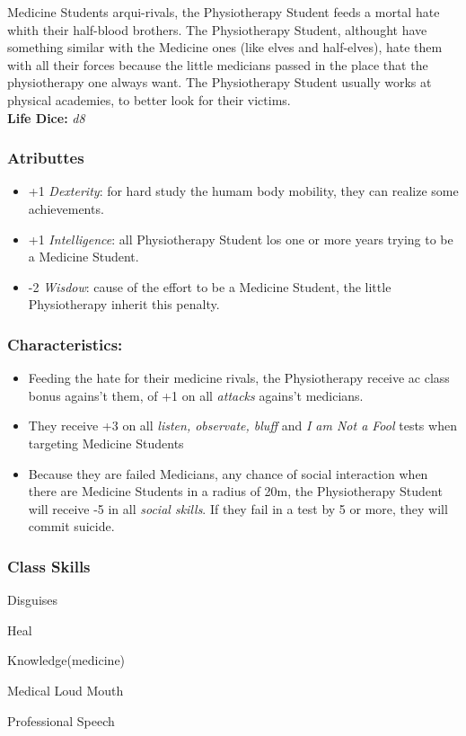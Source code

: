 \documentclass[ letterpaper,12pt]{article}
\begin{document}
Medicine Students arqui-rivals, the Physiotherapy Student feeds a mortal hate whith their half-blood brothers. The Physiotherapy Student, althought have something similar with the Medicine ones (like elves and half-elves), hate them with all their forces because the little medicians passed in the place that the physiotherapy one always want. The Physiotherapy Student usually works at physical academies, to better look for their victims.\\

{\bf Life Dice:} {\it d8}

\subsubsection{Atributtes}
\begin{itemize}
\item{+1 {\it Dexterity}: for hard study the humam body mobility, they can realize some achievements.}
\item{+1 {\it Intelligence}: all Physiotherapy Student los one or more years trying to be a Medicine Student.}
\item{-2 {\it Wisdow}: cause of the effort to be a Medicine Student, the little Physiotherapy inherit this penalty.}
\end{itemize}

\subsubsection{Characteristics:}
\begin{itemize}
\item{Feeding the hate for their medicine rivals, the Physiotherapy receive  ac class bonus agains't them, of +1 on all {\it attacks} agains't medicians.}
\item{They receive +3 on all {\it listen, observate, bluff} and {\it I am Not a Fool} tests when targeting Medicine Students}
\item{Because they are failed Medicians, any chance of social interaction when there are Medicine Students in a radius of 20m, the Physiotherapy Student will receive -5 in all {\it social skills}. If they fail in a test by 5 or more, they will commit suicide.}
\end{itemize}

\subsubsection{Class Skills}
\begin{itemize}
{\it 
\item{Disguises}
\item{Heal}
\item{Knowledge(medicine)}
\item{Medical Loud Mouth}
\item{Professional Speech}
}
\end{itemize}
\end{document}
